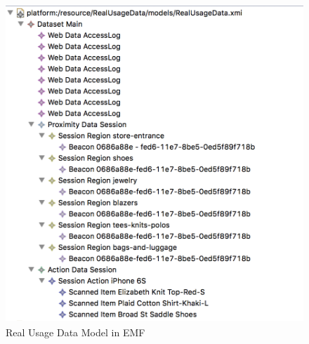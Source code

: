 \vspace{0.5cm}
\begin{figure}[H]
  \centering
    \includegraphics[height=12cm]{images/diagrams/RealUsageDataModel.png}
  \caption{Real Usage Data Model in EMF}
  \label{fig:real-usage-data-model}
\end{figure}
\vspace{0.5cm}

